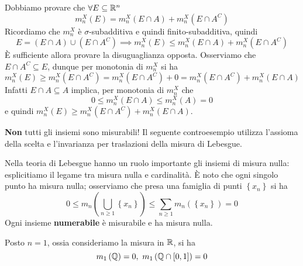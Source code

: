 \begin{demonstration}
	Dobbiamo provare che $\forall E\subseteq \mathbb{R}^n$
	\begin{equation*}
		m_n^X\left(E\right)=m_n^X\left(E\cap A\right)+m_n^X\left(E\cap A^C\right)
	\end{equation*}
	Ricordiamo che $m_n^X$ è $\sigma$-subadditiva e quindi finito-subadditiva, quindi
	\begin{equation*}
		E=\left(E\cap A\right)\cup \left(E\cap A^C\right)\implies m_n^X\left(E\right)\leq m_n^X\left(E\cap A\right)+m_n^X\left(E\cap A^C\right)
	\end{equation*}
	È sufficiente allora provare la disuguaglianza opposta. Osserviamo che $E\cap A^C\subseteq E$, dunque per monotonia di $m_n^X$ si ha
	\begin{equation*}
		m_n^X\left(E\right)\geq m_n^X\left(E\cap A^C\right)=m_n^X\left(E\cap A^C\right)+0=m_n^X\left(E\cap A^C\right)+m_n^X\left(E\cap A\right)
	\end{equation*}
	Infatti $E\cap A\subseteq A$ implica, per monotonia di $m_n^X$ che
	\begin{equation*}
		0\leq m_n^X\left(E\cap A\right)\leq m_n^X\left(A\right)=0
	\end{equation*}
	e quindi $m_n^X\left(E\right)\geq m_n^X\left(E\cap A^C\right)+m_n^X\left(E\cap A\right)$.
\end{demonstration}
\begin{attention}
	\textbf{Non} tutti gli insiemi sono misurabili! Il seguente controesempio utilizza l'assioma della scelta e l'invarianza per traslazioni della misura di Lebesgue.
\end{attention}
Nella teoria di Lebesgue hanno un ruolo importante gli insiemi di misura nulla: esplicitiamo il legame tra misura nulla e cardinalità.
È noto che ogni singolo punto ha misura nulla; osserviamo che presa una famiglia di punti $\left\{x_n\right\}$ si ha
\begin{equation*}
	0\leq m_n\left(\bigcup_{n\geq 1}\left\{x_n\right\}\right)\leq \sum_{n\geq 1}m_n\left(\left\{x_n\right\}\right)=0
\end{equation*}
Ogni insieme \textbf{numerabile} è misurabile e ha misura nulla.
\begin{example}
	Posto $n=1$, ossia consideriamo la misura in $\mathbb{R}$, si ha
	\begin{equation*}
		m_1\left(\rationalset\right)=0,\ m_1\left(\rationalset\cap\left[0,1\right]\right)=0
	\end{equation*}
\end{example}
